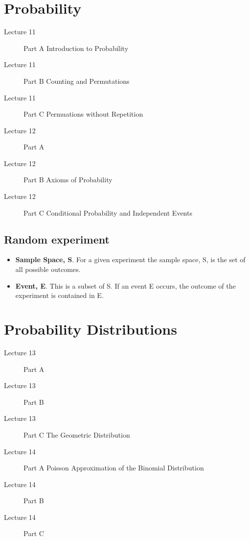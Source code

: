 \documentclass[12pt]{article}
\begin{document}
\section{Probability }
\begin{description}

\item[	Lecture	11	]	Part A	Introduction to Probability
\item[	Lecture	11	]	Part B	Counting and Permutations
\item[	Lecture	11	]	Part C	Permuations without Repetition
\item[	Lecture	12	]	Part A	
\item[	Lecture	12	]	Part B	Axioms of Probability
\item[	Lecture	12	]	Part C	Conditional Probability and Independent Events
\end{description}

\subsection*{Random experiment}
\begin{itemize}
\item \textbf{Sample Space, S}. For a given experiment the sample space, S, is the set of all
possible outcomes.
\item \textbf{Event, E}. This is a subset of S. If an event E occurs, the outcome of the
experiment is contained in E.
\end{itemize}

\newpage
\section{Probability Distributions}
\begin{description}

\item[	Lecture	13	]	Part A	
\item[	Lecture	13	]	Part B	
\item[	Lecture	13	]	Part C	 The Geometric Distribution
\item[	Lecture	14	]	Part A	Poisson Approximation of the Binomial Distribution
\item[	Lecture	14	]	Part B	
\item[	Lecture	14	]	Part C	
\end{description}
\end{document}
